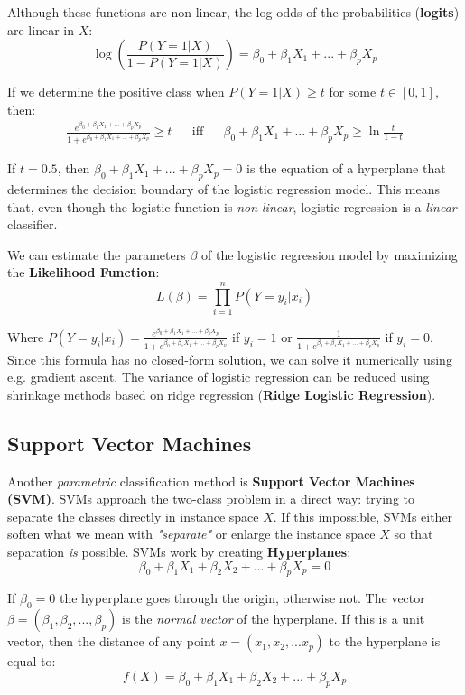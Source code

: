 \documentclass[12pt]{article}
\begin{document}
\noindent
Although these functions are non-linear, the log-odds of the probabilities (\textbf{logits}) are linear in $X$:
\[ \log\left( \frac{P(Y = 1 | X)}{1 - P(Y = 1 | X)} \right) = \beta_0 + \beta_1 X_1 + ... + \beta_p X_p \]

\noindent
If we determine the positive class when $P(Y = 1 | X) \geq t$ for some $t \in [0, 1]$, then:
\begin{align*}
   \frac{e^{\beta_0 + \beta_1 X_1 + ... + \beta_p X_p}}{1 + e^{\beta_0 + \beta_1 X_1 + ... + \beta_p X_p}} \geq t && \text{iff} && \beta_0 + \beta_1 X_1 + ... + \beta_p X_p \geq \ln\frac{t}{1 - t}
\end{align*}

\newpage
\noindent
If $t = 0.5$, then $\beta_0 + \beta_1 X_1 + ... + \beta_p X_p = 0$ is the equation of a hyperplane that determines the decision boundary of the logistic regression model.
This means that, even though the logistic function is \textit{non-linear}, logistic regression is a \textit{linear} classifier.

\noindent
We can estimate the parameters $\beta$ of the logistic regression model by maximizing the \textbf{Likelihood Function}:
\[ L(\beta) = \prod_{i = 1}^n P(Y = y_i | x_i) \]

\noindent
Where $P(Y = y_i | x_i)= \displaystyle\frac{e^{\beta_0 + \beta_1 X_1 + ... + \beta_p X_p}}{1 + e^{\beta_0 + \beta_1 X_1 + ... + \beta_p X_p}}$ if $y_i = 1$ or $\displaystyle\frac{1}{1 + e^{\beta_0 + \beta_1 X_1 + ... + \beta_p X_p}}$ if $y_i = 0$.
Since this formula has no closed-form solution, we can solve it numerically using e.g. gradient ascent.
The variance of logistic regression can be reduced using shrinkage methods based on ridge regression (\textbf{Ridge Logistic Regression}).

\subsection{Support Vector Machines}
\noindent
Another \textit{parametric} classification method is \textbf{Support Vector Machines (SVM)}.
SVMs approach the two-class problem in a direct way: trying to separate the classes directly in instance space $X$.
If this impossible, SVMs either soften what we mean with \textit{"separate"} or enlarge the instance space $X$ so that separation \textit{is} possible.
SVMs work by creating \textbf{Hyperplanes}:
\[ \beta_0 + \beta_1 X_1 + \beta_2 X_2 + ... + \beta_p X_p = 0 \]

\noindent
If $\beta_0 = 0$ the hyperplane goes through the origin, otherwise not.
The vector $\beta = (\beta_1, \beta_2, ... , \beta_p)$ is the \textit{normal vector} of the hyperplane.
If this is a unit vector, then the distance of any point $x = (x_1, x_2, ... x_p)$ to the hyperplane is equal to:
\[ f(X) = \beta_0 + \beta_1 X_1 + \beta_2 X_2 + ... + \beta_p X_p \]
\end{document}

